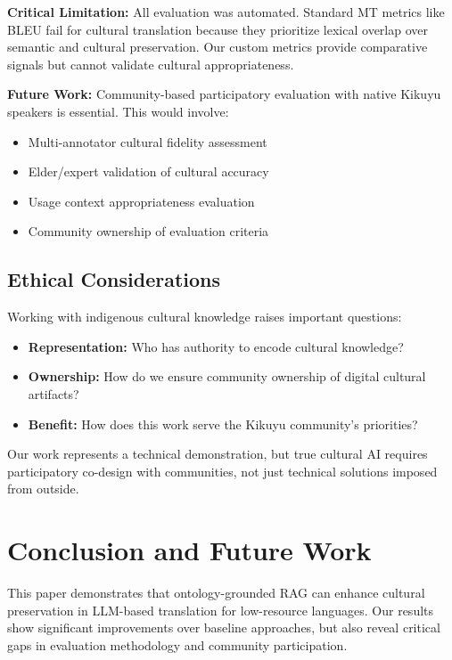 \documentclass[sigconf,nonacm]{acmart}
\begin{document}
\textbf{Critical Limitation:} All evaluation was automated. Standard MT metrics like BLEU fail for cultural translation because they prioritize lexical overlap over semantic and cultural preservation. Our custom metrics provide comparative signals but cannot validate cultural appropriateness.

\textbf{Future Work:} Community-based participatory evaluation with native Kikuyu speakers is essential. This would involve:
\begin{itemize}
    \item Multi-annotator cultural fidelity assessment
    \item Elder/expert validation of cultural accuracy
    \item Usage context appropriateness evaluation
    \item Community ownership of evaluation criteria
\end{itemize}

\subsection{Ethical Considerations}

Working with indigenous cultural knowledge raises important questions:
\begin{itemize}
    \item \textbf{Representation:} Who has authority to encode cultural knowledge?
    \item \textbf{Ownership:} How do we ensure community ownership of digital cultural artifacts?
    \item \textbf{Benefit:} How does this work serve the Kikuyu community's priorities?
\end{itemize}

Our work represents a technical demonstration, but true cultural AI requires participatory co-design with communities, not just technical solutions imposed from outside.

\section{Conclusion and Future Work}

This paper demonstrates that ontology-grounded RAG can enhance cultural preservation in LLM-based translation for low-resource languages. Our results show significant improvements over baseline approaches, but also reveal critical gaps in evaluation methodology and community participation.
\end{document}
